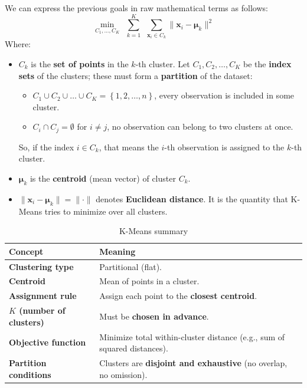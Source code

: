 \highspace
We can express the previous goals in raw mathematical terms as follows:
\begin{equation}
    \min_{C_{1}, ..., C_{K}} \:\: \displaystyle\sum_{k=1}^{K} \:\: \sum_{\mathbf{x}_i \in C_k} \|\mathbf{x}_i - \boldsymbol{\mu}_k\|^{2}
\end{equation}
Where:
\begin{itemize}
    \item $C_{k}$ is the \textbf{set of points} in the $k$-th cluster. Let $C_{1}, C_{2}, \dots, C_{K}$ be the \textbf{index sets} of the clusters; these must form a \textbf{partition} of the dataset:
    \begin{itemize}
        \item $C_{1} \cup C_{2} \cup \dots \cup C_{K} = \left\{ 1, 2, \dots, n \right\}$, every observation is included in some cluster.
        \item $C_{i} \cap C_{j} = \emptyset$ for $i \neq j$, no observation can belong to two clusters at once.
    \end{itemize}
    So, if the index $i \in C_{k}$, that means the $i$-th observation is assigned to the $k$-th cluster.
    \item $\boldsymbol{\mu}_{k}$ is the \textbf{centroid} (mean vector) of cluster $C_{k}$.
    \item $\|\mathbf{x}_i - \boldsymbol{\mu}_k\| = \| \cdot \|$ denotes \textbf{Euclidean distance}. It is the quantity that K-Means tries to minimize over all clusters.
\end{itemize}

\newpage

\begin{table}[!htp]
    \centering
    \begin{tabular}{@{} l | p{20em} @{}}
        \toprule
        Concept & Meaning \\
        \midrule
        \textbf{Clustering type}            & Partitional (flat). \\ [.5em]
        \textbf{Centroid}                   & Mean of points in a cluster. \\ [.5em]
        \textbf{Assignment rule}            & Assign each point to the \textbf{closest centroid}. \\ [.5em]
        \textbf{$K$ (number of clusters)}   & Must be \textbf{chosen in advance}. \\ [.5em]
        \textbf{Objective function}         & Minimize total within-cluster distance (e.g., sum of squared distances). \\ [.5em]
        \textbf{Partition conditions}       & Clusters are \textbf{disjoint and exhaustive} (no overlap, no omission). \\
        \bottomrule
    \end{tabular}
    \caption{K-Means summary}
\end{table}

